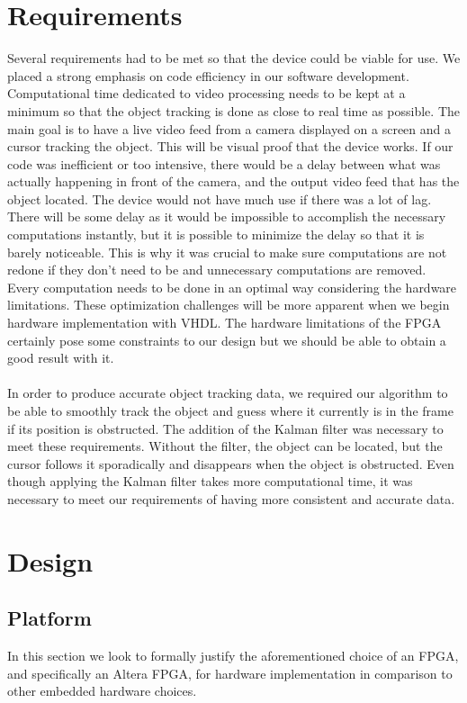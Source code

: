 \documentclass[12pt]{article} %
\begin{document}
\section{Requirements}
Several requirements had to be met so that the device could be viable for use. We placed a strong emphasis on code efficiency in our software development. Computational time dedicated to video processing needs to be kept at a minimum so that the object tracking is done as close to real time as possible. The main goal is to have a live video feed from a camera displayed on a screen and a cursor tracking the object. This will be visual proof that the device works. If our code was inefficient or too intensive, there would be a delay between what was actually happening in front of the camera, and the output video feed that has the object located. The device would not have much use if there was a lot of lag. There will be some delay as it would be impossible to accomplish the necessary computations instantly, but it is possible to minimize the delay so that it is barely noticeable. This is why it was crucial to make sure computations are not redone if they don't need to be and unnecessary computations are removed. Every computation needs to be done in an optimal way considering the hardware limitations. These optimization challenges will be more apparent when we begin hardware implementation with VHDL. The hardware limitations of the FPGA certainly pose some constraints to our design but we should be able to obtain a good result with it. \\\\
In order to produce accurate object tracking data, we required our algorithm to be able to smoothly track the object and guess where it currently is in the frame if its position is obstructed. The addition of the Kalman filter was necessary to meet these requirements. Without the filter, the object can be located, but the cursor follows it sporadically and disappears when the object is obstructed. Even though applying the Kalman filter takes more computational time, it was necessary to meet our requirements of having more consistent and accurate data. 
\section{Design}
\subsection{Platform}
In this section we look to formally justify the aforementioned choice of an FPGA, and specifically an Altera FPGA, for hardware implementation in comparison to other embedded hardware choices. 
\end{document}
